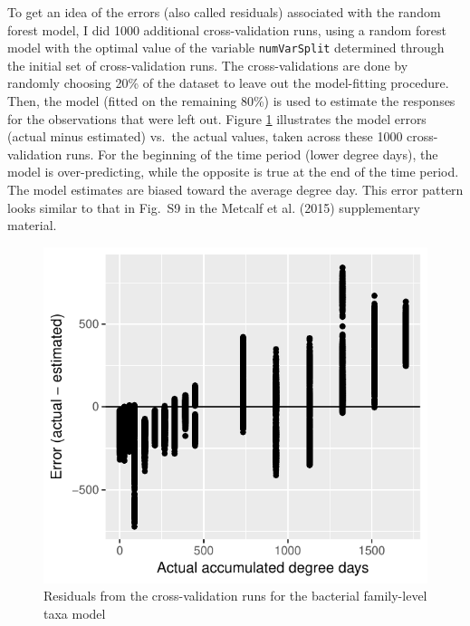 \documentclass{article}
\begin{document}
To get an idea of the errors (also called residuals) associated with
the random forest model, I did 1000 additional cross-validation runs,
using a random forest model with the optimal value of the variable
\texttt{numVarSplit} determined through the initial set of
cross-validation runs.  The cross-validations are done by randomly
choosing 20\% of the dataset to leave out the model-fitting procedure.
Then, the model (fitted on the remaining 80\%) is used to estimate the
responses for the observations that were left out.  Figure
\ref{fig:resids_cv_bac_family_taxa} illustrates the model errors
(actual minus estimated) vs.~the actual values, taken across these
1000 cross-validation runs.  For the beginning of the time period
(lower degree days), the model is over-predicting, while the opposite
is true at the end of the time period.  The model estimates are biased
toward the average degree day.  This error pattern looks similar to
that in Fig.~S9 in the Metcalf et al. (2015) supplementary material.

\begin{figure}
  \centering
  \includegraphics{../revise_algorithm/only_families/all_time_steps/hit_1perc_twice/orig_units_all_data_families_residuals}
  \caption{Residuals from the cross-validation runs for the bacterial
    family-level taxa model}
  \label{fig:resids_cv_bac_family_taxa}
\end{figure}
\end{document}
